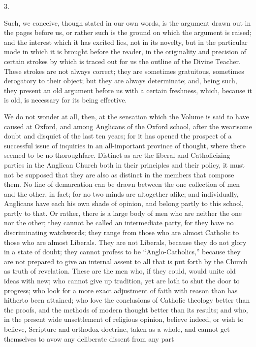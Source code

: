 3.

Such, we conceive, though stated in our own
words, is the argument drawn out in the pages before us, or rather
such is the ground on which the argument is raised; and the
interest which it has excited lies, not in its novelty, but in the
particular mode in which it is brought before the reader, in the
originality and precision of certain strokes by which is traced out
for us the outline of the Divine Teacher. These strokes are not always
correct; they are sometimes gratuitous, sometimes derogatory to their
object; but they are always determinate; and, being such, they present
an old argument before us with a certain freshness, which, because it
is old, is necessary for its being effective.

We do not wonder at all, then, at the sensation
which the Volume is said to have caused at Oxford, and among Anglicans
of the Oxford school, after the wearisome doubt and disquiet of the
last ten years; for it has opened the prospect of a successful issue
of inquiries in an all-important province of thought, where there
seemed to be no thoroughfare. Distinct as are the liberal and
Catholicizing parties in the Anglican Church both in their principles
and their policy, it must not be supposed that they are also as
distinct in the members that compose them. No line of demarcation can
be drawn between the one collection of men and the other, in fact; for
no two minds are altogether alike; and individually, Anglicans have
each his own shade of opinion, and belong partly to this school,
partly to that. Or rather, there is a large body of men who are
neither the one nor the other; they cannot be called an intermediate
party, for they have no discriminating watchwords; they range from
those who are almost Catholic to those who are almost Liberals. They
are not Liberals, because they do not glory in a state of doubt; they
cannot profess to be ``Anglo-Catholics,'' because they are not prepared
to give an internal assent to all that is put forth by the Church as truth of revelation. These are the men who, if they could,
would unite old ideas with new; who cannot give up tradition, yet are
loth to shut the door to progress; who look for a more exact
adjustment of faith with reason than has hitherto been attained; who
love the conclusions of Catholic theology better than the proofs, and
the methods of modern thought better than its results; and who, in the
present wide unsettlement of religious opinion, believe indeed, or
wish to believe, Scripture and orthodox doctrine, taken as a whole,
and cannot get themselves to avow any deliberate dissent from any part
